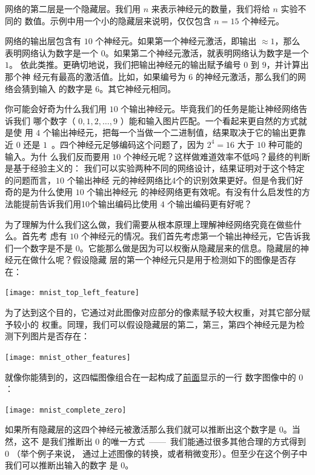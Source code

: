 网络的第二层是一个隐藏层。我们用 $n$ 来表示神经元的数量，我们将给 $n$ 实验不同的
数值。示例中用一个小的隐藏层来说明，仅仅包含 $n=15$ 个神经元。

网络的输出层包含有 $10$ 个神经元。如果第一个神经元激活，即输出 $\approx 1$，那么
表明网络认为数字是一个 $0$。如果第二个神经元激活，就表明网络认为数字是一个 $1$。
依此类推。更确切地说，我们把输出神经元的输出赋予编号 $0$ 到 $9$，并计算出那个神
经元有最高的激活值。比如，如果编号为 $6$ 的神经元激活，那么我们的网络会猜到输入
的数字是 $6$。其它神经元相同。

你可能会好奇为什么我们用 $10$ 个输出神经元。毕竟我们的任务是能让神经网络告诉我们
哪个数字（ $0, 1, 2, \ldots, 9$ ）能和输入图片匹配。一个看起来更自然的方式就是使
用 $4$ 个输出神经元，把每一个当做一个二进制值，结果取决于它的输出更靠近 $0$ 还是
$1$~。四个神经元足够编码这个问题了，因为 $2^4 = 16$ 大于 $10$ 种可能的输入。为什
么我们反而要用 $10$ 个神经元呢？这样做难道效率不低吗？最终的判断是基于经验主义的：
我们可以实验两种不同的网络设计，结果证明对于这个特定的问题而言，$10$ 个输出神经
元的神经网络比4个的识别效果更好。但是令我们好奇的是为什么使用 $10$ 个输出神经元
的神经网络更有效呢。有没有什么启发性的方法能提前告诉我们用10个输出编码比使用 $4$
个输出编码更有好呢？

为了理解为什么我们这么做，我们需要从根本原理上理解神经网络究竟在做些什么。首先考
虑有 $10$ 个神经元的情况。我们首先考虑第一个输出神经元，它告诉我们一个数字是不是
0。它能那么做是因为可以权衡从隐藏层来的信息。隐藏层的神经元在做什么呢？假设隐藏
层的第一个神经元只是用于检测如下的图像是否存在：
\begin{center}
  \texttt{[image: mnist\_top\_left\_feature]}
\end{center}

为了达到这个目的，它通过对此图像对应部分的像素赋予较大权重，对其它部分赋予较小的
权重。同理，我们可以假设隐藏层的第二，第三，第四个神经元是为检测下列图片是否存在：
\begin{center}
  \texttt{[image: mnist\_other\_features]}
\end{center}

就像你能猜到的，这四幅图像组合在一起构成了\hyperref[fig:digits]{前面}显示的一行
数字图像中的 $0$：
\begin{center}
  \texttt{[image: mnist\_complete\_zero]}
\end{center}

如果所有隐藏层的这四个神经元被激活那么我们就可以推断出这个数字是 $0$。当然，这不
是我们推断出 $0$ 的唯一方式~——~我们能通过很多其他合理的方式得到 $0$ （举个例子来说，
  通过上述图像的转换，或者稍微变形）。但至少在这个例子中我们可以推断出输入的数字
是 $0$。

